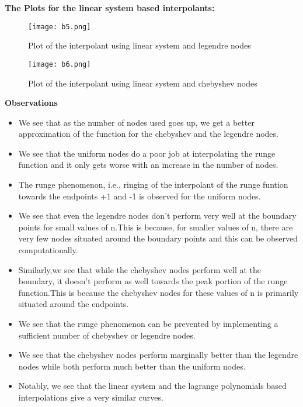 \documentclass[letterpaper]{exam}
\begin{document}
\begin{questions}
\begin{parts}
\begin{solution}
\begin{figure}[H]
\end{figure}
\textbf{The Plots for the linear system based interpolants:}
\begin{figure}[H]  
     \centering
    \texttt{[image: b5.png]}
     \label{fig:Dendrogram for the problem 3(c)}
     \caption{Plot of the interpolant using linear system and legendre nodes}
\end{figure}
\begin{figure}[H]  
     \centering
    \texttt{[image: b6.png]}
     \label{fig:Dendrogram for the problem 3(c)}
     \caption{Plot of the interpolant using linear system and chebyshev nodes}
\end{figure}
\textbf{Observations}
\begin{itemize}
    \item We see that as the number of nodes used goes up, we get a better approximation of the function for the chebyshev and the legendre nodes.
    \item We see that the uniform nodes do a poor job at interpolating the runge function and it only gets worse with an increase in the number of nodes.
    \item The runge phenomenon, i.e., ringing of the interpolant of the runge funtion towards the endpoints +1 and -1 is observed for the uniform nodes.
    \item We see that even the legendre nodes don't perform very well at the boundary points for small values of n.This is because, for smaller values of n, there are very few nodes situated around the boundary points and this can be observed computationally.
    \item Similarly,we see that while the chebyshev nodes perform well at the boundary, it doesn't perform as well towards the peak portion of the runge function.This is because the chebyshev nodes for these values of n is primarily situated around the endpoints.
    \item We see that the runge phenomenon can be prevented by implementing a sufficient number of chebyshev or legendre nodes.
    \item We see that the chebyshev nodes perform marginally better than the legendre nodes while both perform much better than the uniform nodes.
    \item Notably, we see that the linear system and the lagrange polynomials based interpolations give a very similar curves.
\end{itemize}


\end{solution}
\end{parts}
\end{questions}
\end{document}
